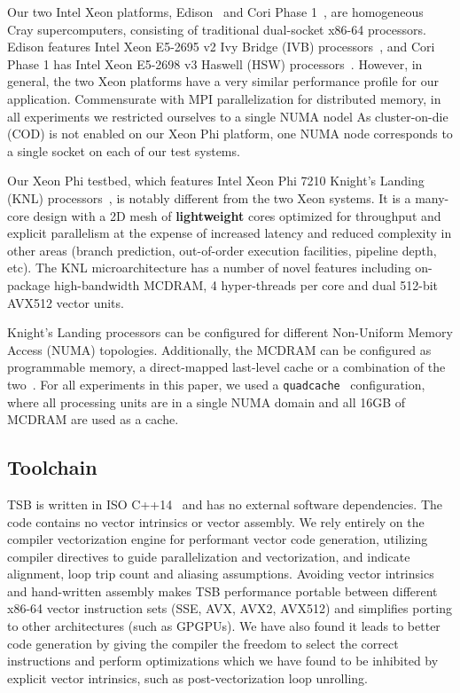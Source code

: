 \documentclass[10pt, conference, compsocconf]{IEEEtran}
\begin{document}
Our two Intel Xeon platforms, Edison~\cite{nersc_edison_config} and Cori Phase
  1~\cite{nersc_cori_p1_config}, are homogeneous Cray supercomputers,
  consisting of traditional dual-socket x86-64 processors.
Edison features Intel Xeon E5-2695 v2 Ivy Bridge
  (IVB) processors~\cite{intel_ark_xeon_e5_2695_v2}, and Cori Phase 1 has Intel
  Xeon E5-2698 v3 Haswell (HSW) processors~\cite{intel_ark_xeon_e5_2698_v3}.
However, in general, the two Xeon platforms have a very similar performance
  profile for our application.
Commensurate with MPI parallelization for distributed memory, in all experiments
  we restricted ourselves to a single NUMA nodel
As cluster-on-die (COD) is not enabled on our Xeon Phi platform, one NUMA node
  corresponds to a single socket on each of our test systems.

Our Xeon Phi testbed, which features Intel Xeon Phi 7210 Knight's Landing
  (KNL) processors~\cite{intel_ark_xeon_phi_7210}, is notably different from
  the two Xeon systems.
It is a many-core design with a 2D mesh of \textbf{lightweight} cores optimized
  for throughput and explicit parallelism at the expense of increased latency
  and reduced complexity in other areas (branch prediction, out-of-order
  execution facilities, pipeline depth, etc).
The KNL microarchitecture has a number of novel features including on-package
  high-bandwidth MCDRAM, 4 hyper-threads per core and dual 512-bit
  AVX512 vector units.~\cite{roofline_knl,knl_sodani}

Knight's Landing processors can be configured for different Non-Uniform Memory
  Access (NUMA) topologies.
Additionally, the MCDRAM can be configured as programmable memory, a
  direct-mapped last-level cache or a combination of the
  two~\cite{knl_sodani}.
For all experiments in this paper, we used a
  \lstinline{quadcache}~\cite{roofline_knl} configuration, where all processing
  units are in a single NUMA domain and all 16GB of MCDRAM are used as a cache.

\subsection{Toolchain}
\label{sec:setup:toolchain}

TSB is written in ISO C++14~\cite{cxx14_spec} and has no external software
  dependencies.
The code contains no vector intrinsics or vector assembly.
We rely entirely on the compiler vectorization engine for performant vector
  code generation, utilizing compiler directives to guide parallelization and
  vectorization, and indicate alignment, loop trip count and aliasing
  assumptions.
Avoiding vector intrinsics and hand-written assembly makes TSB performance
  portable between different x86-64 vector instruction sets (SSE, AVX, AVX2,
  AVX512) and simplifies porting to other architectures (such as GPGPUs).
We have also found it leads to better code generation by giving the compiler
  the freedom to select the correct instructions and perform optimizations which
  we have found to be inhibited by explicit vector intrinsics, such as
  post-vectorization loop unrolling.
\end{document}
